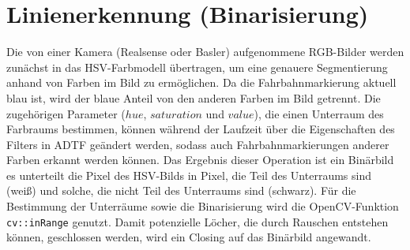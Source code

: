 \documentclass[a4paper,12pt]{report}
\begin{document}
\section{Linienerkennung (Binarisierung)}	
	Die von einer Kamera (Realsense oder Basler) aufgenommene RGB-Bilder werden zunächst in das HSV-Farbmodell übertragen, um eine genauere Segmentierung anhand von Farben im Bild zu ermöglichen.
	Da die Fahrbahnmarkierung aktuell blau ist, wird der blaue Anteil von den anderen Farben im Bild getrennt. Die zugehörigen Parameter ($hue$, $saturation$ und $value$), die einen Unterraum des Farbraums bestimmen, können während der Laufzeit über die Eigenschaften des Filters in ADTF geändert werden, sodass auch Fahrbahnmarkierungen anderer Farben erkannt werden können.
	Das Ergebnis dieser Operation ist ein Binärbild es unterteilt die Pixel des HSV-Bilds in Pixel, die Teil des Unterraums sind (weiß) und solche, die nicht Teil des Unterraums sind (schwarz). Für die Bestimmung der Unterräume sowie die Binarisierung wird die OpenCV-Funktion \texttt{cv::inRange} genutzt.
	Damit potenzielle Löcher, die durch Rauschen entstehen können, geschlossen werden, wird ein Closing auf das Binärbild angewandt.
\end{document}
